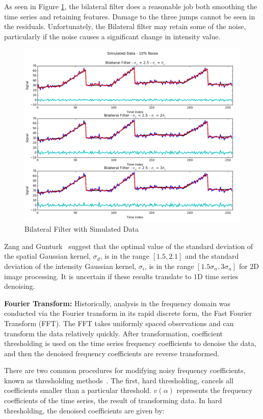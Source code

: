 \documentclass[11pt]{article}
\newcommand{\vs}{\vspace{0.1in}}
\theoremstyle{definition}
\begin{document}
As seen in Figure \ref{bilateralcompare}, the bilateral filter does a reasonable job both smoothing the time series and retaining features. Damage to the three jumps cannot be seen in the residuals. Unfortunately, the Bilateral filter may retain some of the noise, particularly if the noise causes a significant change in intensity value.

\begin{figure}
\centering
\includegraphics[width = 0.65 \textwidth]{BilateralCompare.png}
\caption{Bilateral Filter with Simulated Data}
\label{bilateralcompare}
\end{figure}

Zang and Gunturk~\cite{Zang08} suggest that the optimal value of the standard deviation of the spatial Gaussian kernel, $\sigma_d$, is in the range $\left[ 1.5, 2.1 \right]$ and the standard deviation of the intensity Gaussian kernel, $\sigma_i$, is in the range $\left[ 1.5 \sigma_n, 3 \sigma_n \right]$ for $2$D image processing. It is uncertain if these results translate to $1$D time series denoising.

\vs
\noindent
\textbf{Fourier Transform:} Historically, analysis in the frequency domain was conducted via the Fourier transform in its rapid discrete form, the Fast Fourier Transform (FFT). The FFT takes uniformly spaced observations and can transform the data relatively quickly. After transformation, coefficient thresholding is used on the time series frequency coefficients to denoise the data, and then the denoised frequency coefficients are reverse transformed.

There are two common procedures for modifying noisy frequency coefficients, known as thresholding methods~\cite{Donoho94}. The first, hard thresholding, cancels all coefficients smaller than a particular threshold. $v\left(\alpha\right)$ represents the frequency coefficients of the time series, the result of transforming data. In hard thresholding, the denoised coefficients are given by:
\end{document}

